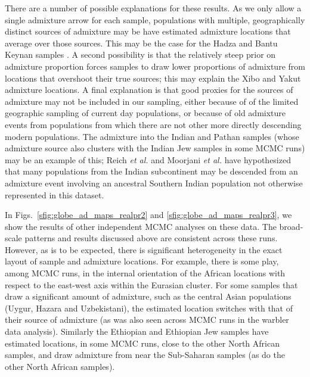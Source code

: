 \documentclass[10pt,letterpaper]{article}
\begin{document}
There are a number of possible explanations for these results. As we only allow a single admixture arrow for each sample, populations with multiple, geographically distinct sources of admixture may be have estimated admixture locations that average over those sources. This may be the case for the Hadza and Bantu Keynan samples \cite{Hellenthal}.  A second possibility is that the relatively steep prior on admixture proportion forces samples to draw lower proportions of admixture from locations that overshoot their true sources; this may explain the Xibo and Yakut admixture locations. A final explanation is that good proxies for the sources of admixture may not be included in our sampling, either because of of the limited geographic sampling of current day populations, or because of old admixture events from populations from which there are not other more directly descending modern populations. The admixture into the Indian and Pathan samples (whose admixture source also clusters with the Indian Jew samples in some MCMC runs) may be an example of this; Reich \emph{et al.} \cite{reich_india_2009} and Moorjani \emph{et al.} \cite{moorjani_india_2013} have hypothesized that many populations from the Indian subcontinent may be descended from an admixture event involving an ancestral Southern Indian population not otherwise represented in this dataset.

In Figs.\ \ref{sfig:globe_ad_maps_realpr2} and \ref{sfig:globe_ad_maps_realpr3}, we show the results of other independent MCMC analyses on these data. The broad-scale patterns and results discussed above are consistent across these runs. However, as is to be expected, there is significant heterogeneity in the exact layout of sample and admixture locations. For example, there is some play, among MCMC runs, in the internal orientation of the African locations with respect to the east-west axis within the Eurasian cluster.  For some samples that draw a significant amount of admixture, such as the central Asian populations (Uygur, Hazara and Uzbekistani), the estimated location switches with that of their source of admixture (as was also seen across MCMC runs in the warbler data analysis). Similarly the Ethiopian and Ethiopian Jew samples have estimated locations, in some MCMC runs, close to the other North African samples, and draw admixture from near the Sub-Saharan samples (as do the other North African samples).
\end{document}
